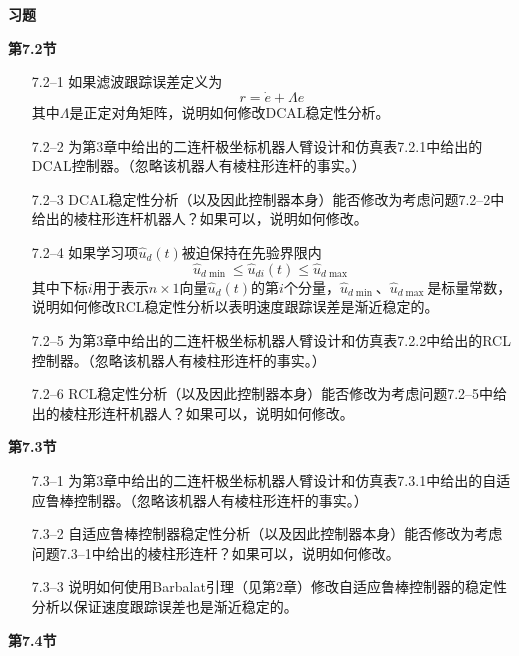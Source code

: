 \documentclass[UTF8]{ctexart}
\begin{document}
\vspace{1cm}
\noindent\textbf{习题}

\textbf{第7.2节}

\begin{enumerate}
\item[7.2--1] 如果滤波跟踪误差定义为
\[ r = \dot{e} + \Lambda e \]
其中$\Lambda$是正定对角矩阵，说明如何修改DCAL稳定性分析。

\item[7.2--2] 为第3章中给出的二连杆极坐标机器人臂设计和仿真表7.2.1中给出的DCAL控制器。（忽略该机器人有棱柱形连杆的事实。）

\item[7.2--3] DCAL稳定性分析（以及因此控制器本身）能否修改为考虑问题7.2--2中给出的棱柱形连杆机器人？如果可以，说明如何修改。

\item[7.2--4] 如果学习项$\hat{u}_d(t)$被迫保持在先验界限内
\[ \hat{u}_{d\min} \leq \hat{u}_{di}(t) \leq \hat{u}_{d\max} \]
其中下标$i$用于表示$n \times 1$向量$\hat{u}_d(t)$的第$i$个分量，$\hat{u}_{d\min}$、$\hat{u}_{d\max}$是标量常数，说明如何修改RCL稳定性分析以表明速度跟踪误差是渐近稳定的。

\item[7.2--5] 为第3章中给出的二连杆极坐标机器人臂设计和仿真表7.2.2中给出的RCL控制器。（忽略该机器人有棱柱形连杆的事实。）

\item[7.2--6] RCL稳定性分析（以及因此控制器本身）能否修改为考虑问题7.2--5中给出的棱柱形连杆机器人？如果可以，说明如何修改。
\end{enumerate}

\textbf{第7.3节}

\begin{enumerate}
\item[7.3--1] 为第3章中给出的二连杆极坐标机器人臂设计和仿真表7.3.1中给出的自适应鲁棒控制器。（忽略该机器人有棱柱形连杆的事实。）

\item[7.3--2] 自适应鲁棒控制器稳定性分析（以及因此控制器本身）能否修改为考虑问题7.3--1中给出的棱柱形连杆？如果可以，说明如何修改。

\item[7.3--3] 说明如何使用Barbalat引理（见第2章）修改自适应鲁棒控制器的稳定性分析以保证速度跟踪误差也是渐近稳定的。
\end{enumerate}

\textbf{第7.4节}
\end{document}
